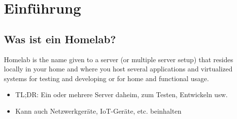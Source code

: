 \documentclass[
    ngerman,
    accentcolor=3b,
    fontsize= 12pt,
    a4paper,
    aspectratio=169,
    colorback=true,
    fancy_row_colors,
    leqno,
    fleqn,
    boxarc=3pt,
    fleqn,
    main,
    design=2008,
]{algoslides}
\begin{document}
    \section{Einführung}\label{1}\label{Einfuehrung}
    \subsection{Was ist ein Homelab?}
    \begin{frame}
        \slidehead{}
        \begin{defBox}[title=Definition: Homelab]
            Homelab is the name given to a server (or multiple server setup) that resides locally in your home and where you host several applications and virtualized systems for testing and developing or for home and functional usage.
        \end{defBox}
        \begin{itemize}
            \item TL;DR: Ein oder mehrere Server daheim, zum Testen, Entwickeln usw.
            \item Kann auch Netzwerkgeräte, IoT-Geräte, etc. beinhalten
        \end{itemize}
    \end{frame}
\end{document}
